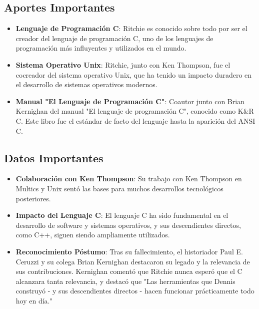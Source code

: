 \documentclass[11pt,twoside]{book}
\begin{document}
\subsection*{ Aportes Importantes}
\begin{itemize}



  \item \textbf{Lenguaje de Programación C}: Ritchie es conocido sobre todo por ser el creador del lenguaje de programación C, uno de los lenguajes de programación más influyentes y utilizados en el mundo.
  \item \textbf{Sistema Operativo Unix}: Ritchie, junto con Ken Thompson, fue el cocreador del sistema operativo Unix, que ha tenido un impacto duradero en el desarrollo de sistemas operativos modernos.
  \item \textbf{Manual "El Lenguaje de Programación C"}: Coautor junto con Brian Kernighan del manual "El lenguaje de programación C", conocido como K&R C. Este libro fue el estándar de facto del lenguaje hasta la aparición del ANSI C.
\end{itemize}
\subsection*{ Datos Importantes}
\begin{itemize}
  \item \textbf{Colaboración con Ken Thompson}: Su trabajo con Ken Thompson en Multics y Unix sentó las bases para muchos desarrollos tecnológicos posteriores.

  \item \textbf{Impacto del Lenguaje C}: El lenguaje C ha sido fundamental en el desarrollo de software y sistemas operativos, y sus descendientes directos, como C++, siguen siendo ampliamente utilizados.

  \item \textbf{Reconocimiento Póstumo}: Tras su fallecimiento, el historiador Paul E. Ceruzzi y su colega Brian Kernighan destacaron su legado y la relevancia de sus contribuciones. Kernighan comentó que Ritchie nunca esperó que el C alcanzara tanta relevancia, y destacó que "Las herramientas que Dennis construyó - y sus descendientes directos - hacen funcionar prácticamente todo hoy en día."
\end{itemize}

\newpage
\end{document}
